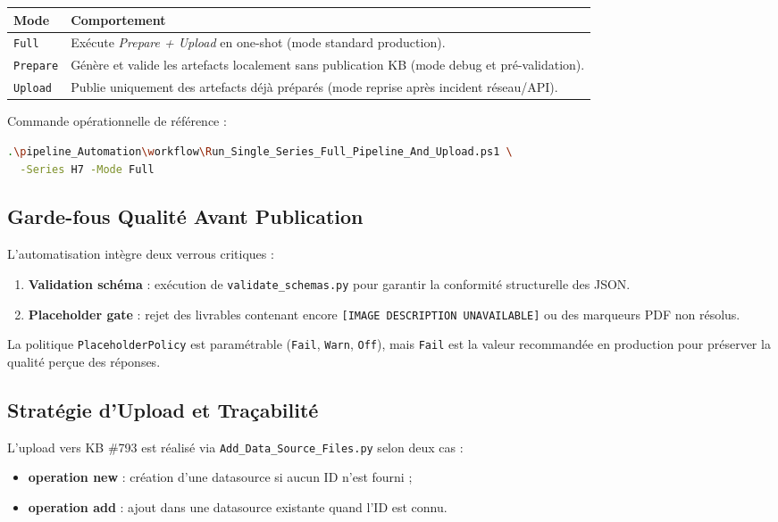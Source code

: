\begin{longtable}{p{2.8cm}p{9.4cm}}
\toprule
\textbf{Mode} & \textbf{Comportement} \\
\midrule
\texttt{Full} & Exécute \textit{Prepare + Upload} en one-shot (mode standard production). \\
\texttt{Prepare} & Génère et valide les artefacts localement sans publication KB (mode debug et pré-validation). \\
\texttt{Upload} & Publie uniquement des artefacts déjà préparés (mode reprise après incident réseau/API). \\
\bottomrule
\end{longtable}

Commande opérationnelle de référence :
\begin{lstlisting}[language=bash]
.\pipeline_Automation\workflow\Run_Single_Series_Full_Pipeline_And_Upload.ps1 \
  -Series H7 -Mode Full
\end{lstlisting}

\subsection{Garde-fous Qualité Avant Publication}

L'automatisation intègre deux verrous critiques :
\begin{enumerate}
  \item \textbf{Validation schéma} : exécution de \texttt{validate\_schemas.py} pour garantir la conformité structurelle des JSON.
  \item \textbf{Placeholder gate} : rejet des livrables contenant encore \texttt{[IMAGE DESCRIPTION UNAVAILABLE]} ou des marqueurs PDF non résolus.
\end{enumerate}

La politique \texttt{PlaceholderPolicy} est paramétrable (\texttt{Fail}, \texttt{Warn}, \texttt{Off}), mais \texttt{Fail} est la valeur recommandée en production pour préserver la qualité perçue des réponses.

\subsection{Stratégie d'Upload et Traçabilité}

L'upload vers KB \#793 est réalisé via \texttt{Add\_Data\_Source\_Files.py} selon deux cas :
\begin{itemize}
  \item \textbf{operation new} : création d'une datasource si aucun ID n'est fourni ;
  \item \textbf{operation add} : ajout dans une datasource existante quand l'ID est connu.
\end{itemize}

